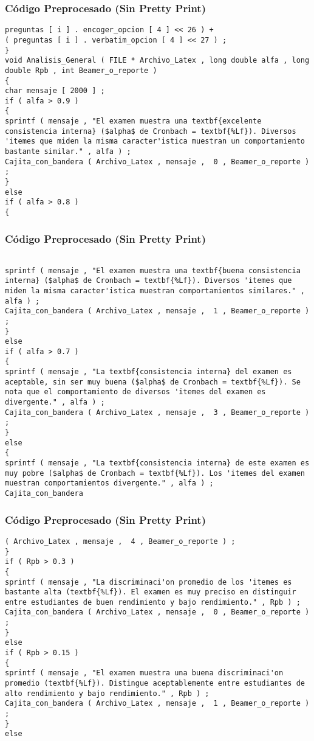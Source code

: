 \documentclass{beamer}
\begin{document}
\begin{frame}[fragile]
\frametitle{C\'odigo Preprocesado (Sin Pretty Print)}
\begin{lstlisting}[style=CStyle]
preguntas [ i ] . encoger_opcion [ 4 ] << 26 ) + 
( preguntas [ i ] . verbatim_opcion [ 4 ] << 27 ) ; 
} 
void Analisis_General ( FILE * Archivo_Latex , long double alfa , long double Rpb , int Beamer_o_reporte ) 
{ 
char mensaje [ 2000 ] ; 
if ( alfa > 0.9 ) 
{ 
sprintf ( mensaje , "El examen muestra una textbf{excelente consistencia interna} ($alpha$ de Cronbach = textbf{%Lf}). Diversos 'itemes que miden la misma caracter'istica muestran un comportamiento bastante similar." , alfa ) ; 
Cajita_con_bandera ( Archivo_Latex , mensaje ,  0 , Beamer_o_reporte ) ; 
} 
else 
if ( alfa > 0.8 ) 
{ \end{lstlisting}
\end{frame}
\begin{frame}[fragile]
\frametitle{C\'odigo Preprocesado (Sin Pretty Print)}
\begin{lstlisting}[style=CStyle]

sprintf ( mensaje , "El examen muestra una textbf{buena consistencia interna} ($alpha$ de Cronbach = textbf{%Lf}). Diversos 'itemes que miden la misma caracter'istica muestran comportamientos similares." , alfa ) ; 
Cajita_con_bandera ( Archivo_Latex , mensaje ,  1 , Beamer_o_reporte ) ; 
} 
else 
if ( alfa > 0.7 ) 
{ 
sprintf ( mensaje , "La textbf{consistencia interna} del examen es aceptable, sin ser muy buena ($alpha$ de Cronbach = textbf{%Lf}). Se nota que el comportamiento de diversos 'itemes del examen es divergente." , alfa ) ; 
Cajita_con_bandera ( Archivo_Latex , mensaje ,  3 , Beamer_o_reporte ) ; 
} 
else 
{ 
sprintf ( mensaje , "La textbf{consistencia interna} de este examen es muy pobre ($alpha$ de Cronbach = textbf{%Lf}). Los 'itemes del examen muestran comportamientos divergente." , alfa ) ; 
Cajita_con_bandera \end{lstlisting}
\end{frame}
\begin{frame}[fragile]
\frametitle{C\'odigo Preprocesado (Sin Pretty Print)}
\begin{lstlisting}[style=CStyle]
( Archivo_Latex , mensaje ,  4 , Beamer_o_reporte ) ; 
} 
if ( Rpb > 0.3 ) 
{ 
sprintf ( mensaje , "La discriminaci'on promedio de los 'itemes es bastante alta (textbf{%Lf}). El examen es muy preciso en distinguir entre estudiantes de buen rendimiento y bajo rendimiento." , Rpb ) ; 
Cajita_con_bandera ( Archivo_Latex , mensaje ,  0 , Beamer_o_reporte ) ; 
} 
else 
if ( Rpb > 0.15 ) 
{ 
sprintf ( mensaje , "El examen muestra una buena discriminaci'on promedio (textbf{%Lf}). Distingue aceptablemente entre estudiantes de alto rendimiento y bajo rendimiento." , Rpb ) ; 
Cajita_con_bandera ( Archivo_Latex , mensaje ,  1 , Beamer_o_reporte ) ; 
} 
else \end{lstlisting}
\end{frame}
\end{document}
